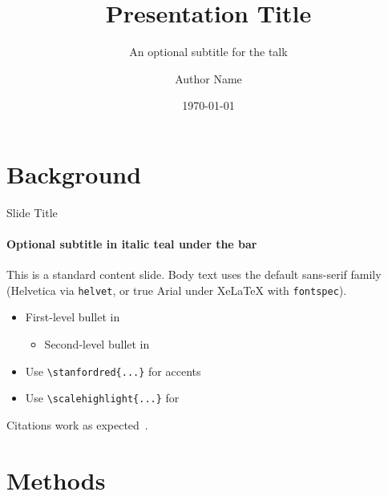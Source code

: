 \documentclass[aspectratio=169,t]{beamer}
\title{Presentation Title}
\subtitle{An optional subtitle for the talk}
\author{Author Name}
\institute{Stanford SCALE Initiative}
\date{\today}
\begin{document}
\begin{frame}
  \titlepage
\end{frame}

\section{Background}
\roadmapframe


\begin{frame}[fragile]{Slide Title}
  \framesubtitle{Optional subtitle in italic teal under the bar}

  This is a standard content slide. Body text uses the default sans-serif
  family (Helvetica via \texttt{helvet}, or true Arial under XeLaTeX with
  \texttt{fontspec}).

  \begin{itemize}
    \item First-level bullet in 
    \begin{itemize}
      \item Second-level bullet in 
    \end{itemize}
    \item Use \verb|\stanfordred{...}| for  accents
    \item Use \verb|\scalehighlight{...}| for 
  \end{itemize}

  Citations work as expected~\parencite{example2024}.
\end{frame}

\section{Methods}
\roadmapframe
\end{document}
